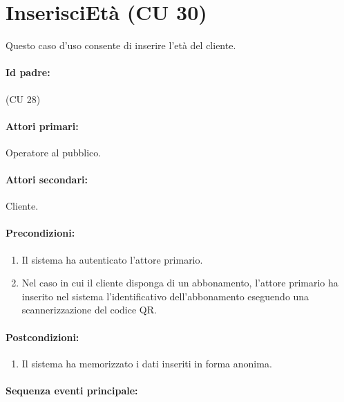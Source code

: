 \documentclass{article}
\begin{document}
\section*{InserisciEtà (CU 30)}
	
	\indent\indent Questo caso d'uso consente di inserire l'età del cliente.
	
	\paragraph{Id padre:} (CU 28)
	
	\paragraph{Attori primari:}Operatore al pubblico.
	
	\paragraph{Attori secondari:}Cliente.
	
	\paragraph{Precondizioni:}
	\begin{enumerate}[itemsep=8pt,parsep=0pt]
		\item Il sistema ha autenticato l'attore primario.
		\item Nel caso in cui il cliente disponga di un abbonamento, l'attore primario ha inserito nel sistema l'identificativo dell'abbonamento eseguendo una scannerizzazione del codice QR.
	\end{enumerate}

	\paragraph{Postcondizioni:}
	\begin{enumerate}[itemsep=8pt,parsep=0pt]
		\item Il sistema ha memorizzato i dati inseriti in forma anonima.
	\end{enumerate}

	\paragraph{Sequenza eventi principale:}
\end{document}
